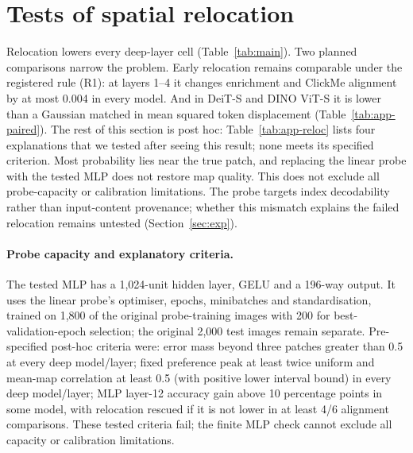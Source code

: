 \begin{table}[!htbp]
\caption{Stored model-randomisation results: median map correlation after full randomisation. The five readings pass the registered $<0.5$ criterion in every model.}
\label{tab:sanity}
\centering\small

\end{table}


\clearpage
\section{Tests of spatial relocation}
\label{app:reloc}

Relocation lowers every deep-layer cell (Table~\ref{tab:main}). Two planned comparisons narrow the problem. Early relocation remains comparable under the registered rule (R1): at layers 1--4 it changes enrichment and ClickMe alignment by at most 0.004 in every model. And in DeiT-S and DINO ViT-S it is lower than a Gaussian matched in mean squared token displacement (Table~\ref{tab:app-paired}). The rest of this section is post hoc: Table~\ref{tab:app-reloc} lists four explanations that we tested after seeing this result; none meets its specified criterion. Most probability lies near the true patch, and replacing the linear probe with the tested MLP does not restore map quality. This does not exclude all probe-capacity or calibration limitations. The probe targets index decodability rather than input-content provenance; whether this mismatch explains the failed relocation remains untested (Section~\ref{sec:exp}).

\begin{table}[!htbp]
\caption{Four explanations for probe-relocation failure (post hoc). Model order: DeiT-S, DeiT-B, DINO ViT-S. Cells are the two centre-controlled metrics in the three models; criteria and probe settings are defined in this section.}
\label{tab:app-reloc}
\centering

\end{table}

\paragraph{Probe capacity and explanatory criteria.} The tested MLP has a 1,024-unit hidden layer, GELU and a 196-way output. It uses the linear probe's optimiser, epochs, minibatches and standardisation, trained on 1,800 of the original probe-training images with 200 for best-validation-epoch selection; the original 2,000 test images remain separate. Pre-specified post-hoc criteria were: error mass beyond three patches greater than 0.5 at every deep model/layer; fixed preference peak at least twice uniform and mean-map correlation at least 0.5 (with positive lower interval bound) in every deep model/layer; MLP layer-12 accuracy gain above 10 percentage points in some model, with relocation rescued if it is not lower in at least 4/6 alignment comparisons. These tested criteria fail; the finite MLP check cannot exclude all capacity or calibration limitations.

